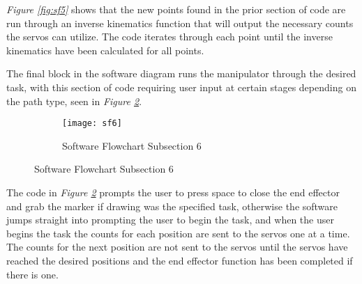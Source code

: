 \emph{Figure \ref{fig:sf5}} shows that the new points found in the prior section of code are run through an inverse kinematics function that will output the necessary counts the servos can utilize. The code iterates through each point until the inverse kinematics have been calculated for all points.

The final block in the software diagram runs the manipulator through the desired task, with this section of code requiring user input at certain stages depending on the path type, seen in \emph{Figure \ref{fig:sf6}}.
\begin{figure}[htp] \ContinuedFloat
  \begin{subfigure}[c]{\textwidth}
  \center
  \texttt{[image: sf6]}
  \caption{Software Flowchart Subsection 6}
  \label{fig:sf6}
  \end{subfigure}
\end{figure}

The code in \emph{Figure \ref{fig:sf6}} prompts the user to press space to close the end effector and grab the marker if drawing was the specified task, otherwise the software jumps straight into prompting the user to begin the task, and when the user begins the task the counts for each position are sent to the servos one at a time. The counts for the next position are not sent to the servos until the servos have reached the desired positions and the end effector function has been completed if there is one.
